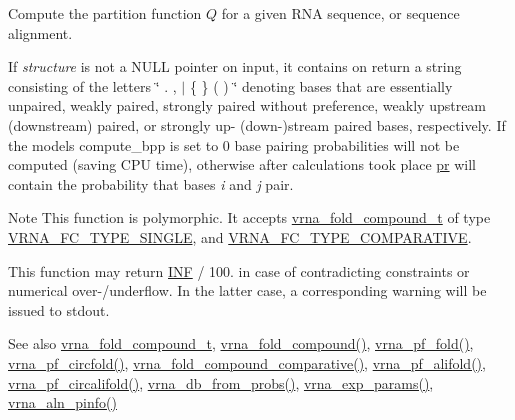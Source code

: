 Compute the partition function $Q$ for a given R\+NA sequence, or sequence alignment. 

If {\itshape structure} is not a N\+U\+LL pointer on input, it contains on return a string consisting of the letters \char`\"{} . , $\vert$ \{ \} ( ) \char`\"{} denoting bases that are essentially unpaired, weakly paired, strongly paired without preference, weakly upstream (downstream) paired, or strongly up-\/ (down-\/)stream paired bases, respectively. If the model\textquotesingle{}s compute\+\_\+bpp is set to 0 base pairing probabilities will not be computed (saving C\+PU time), otherwise after calculations took place \mbox{\hyperlink{fold__vars_8h_ac98ec419070aee6831b44e5c700f090f}{pr}} will contain the probability that bases {\itshape i} and {\itshape j} pair.

\begin{DoxyNote}{Note}
This function is polymorphic. It accepts \mbox{\hyperlink{group__fold__compound_ga1b0cef17fd40466cef5968eaeeff6166}{vrna\+\_\+fold\+\_\+compound\+\_\+t}} of type \mbox{\hyperlink{group__fold__compound_gga01a4ff86fa71deaaa5d1abbd95a1447da7e264dd3cf2dc9b6448caabcb7763cd6}{V\+R\+N\+A\+\_\+\+F\+C\+\_\+\+T\+Y\+P\+E\+\_\+\+S\+I\+N\+G\+LE}}, and \mbox{\hyperlink{group__fold__compound_gga01a4ff86fa71deaaa5d1abbd95a1447dab821ce46ea3cf665be97df22a76f5023}{V\+R\+N\+A\+\_\+\+F\+C\+\_\+\+T\+Y\+P\+E\+\_\+\+C\+O\+M\+P\+A\+R\+A\+T\+I\+VE}}.

This function may return \mbox{\hyperlink{constants_8h_a12c2040f25d8e3a7b9e1c2024c618cb6}{I\+NF}} / 100. in case of contradicting constraints or numerical over-\//underflow. In the latter case, a corresponding warning will be issued to {\ttfamily stdout}.
\end{DoxyNote}
\begin{DoxySeeAlso}{See also}
\mbox{\hyperlink{group__fold__compound_ga1b0cef17fd40466cef5968eaeeff6166}{vrna\+\_\+fold\+\_\+compound\+\_\+t}}, \mbox{\hyperlink{group__fold__compound_ga6601d994ba32b11511b36f68b08403be}{vrna\+\_\+fold\+\_\+compound()}}, \mbox{\hyperlink{group__part__func__global_gac4a2a74a79e49818bc35412a2b392c7e}{vrna\+\_\+pf\+\_\+fold()}}, \mbox{\hyperlink{group__part__func__global_ga87e5a77b6e50dd54e9d032a9b92973be}{vrna\+\_\+pf\+\_\+circfold()}}, \mbox{\hyperlink{group__fold__compound_gad6bacc816af274922b13d947f708aa0c}{vrna\+\_\+fold\+\_\+compound\+\_\+comparative()}}, \mbox{\hyperlink{group__part__func__global_ga374e31a0f326b2c5da5b84e143a63f38}{vrna\+\_\+pf\+\_\+alifold()}}, \mbox{\hyperlink{group__part__func__global_gab70fe6c9a78b79cc5669881720926e1d}{vrna\+\_\+pf\+\_\+circalifold()}}, \mbox{\hyperlink{group__struct__utils_ga0c28c410a5ab22d6ab9c77a84e8d5b44}{vrna\+\_\+db\+\_\+from\+\_\+probs()}}, \mbox{\hyperlink{group__energy__parameters_gab1f3016f96aa96bff020cdd904605afa}{vrna\+\_\+exp\+\_\+params()}}, \mbox{\hyperlink{group__aln__utils_gaf6421a1318586c59fea6a127ed9f65f3}{vrna\+\_\+aln\+\_\+pinfo()}}
\end{DoxySeeAlso}

